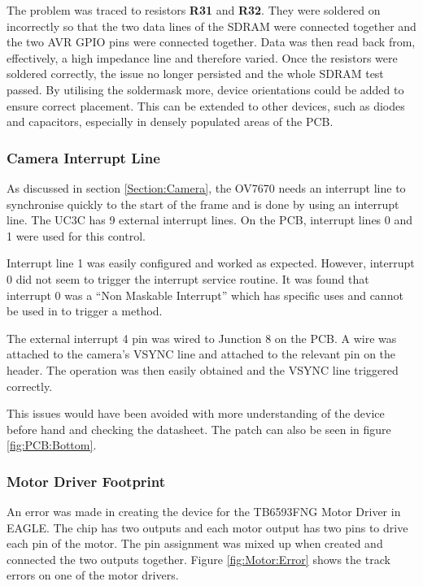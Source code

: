 The problem was traced to resistors \textbf{R31} and \textbf{R32}. They were soldered on incorrectly so that the two data lines of the SDRAM were connected together and the two AVR GPIO pins were connected together. Data was then read back from, effectively, a high impedance line and therefore varied. Once the resistors were soldered correctly, the issue no longer persisted and the whole SDRAM test passed. By utilising the soldermask more, device orientations could be added to ensure correct placement. This can be extended to other devices, such as diodes and capacitors, especially in densely populated areas of the PCB. 

\subsubsection{Camera Interrupt Line}

As discussed in section \ref{Section:Camera}, the OV7670 needs an interrupt line to synchronise quickly to the start of the frame and is done by using an interrupt line. The UC3C has 9 external interrupt lines. On the PCB, interrupt lines 0 and 1 were used for this control.

Interrupt line 1 was easily configured and worked as expected. However, interrupt 0 did not seem to trigger the interrupt service routine. It was found that interrupt 0 was a ``Non Maskable Interrupt'' which has specific uses and cannot be used in to trigger a method. 

The external interrupt 4 pin was wired to Junction 8 on the PCB. A wire was attached to the camera's VSYNC line and attached to the relevant pin on the header. The operation was then easily obtained and the VSYNC line triggered correctly.

This issues would have been avoided with more understanding of the device before hand and checking the datasheet. The patch can also be seen in figure \ref{fig:PCB:Bottom}.


\subsubsection{Motor Driver Footprint}

An error was made in creating the device for the TB6593FNG Motor Driver in EAGLE. The chip has two outputs and each motor output has two pins to drive each pin of the motor. The pin assignment was mixed up when created and connected the two outputs together. Figure \ref{fig:Motor:Error} shows the track errors on one of the motor drivers. 

